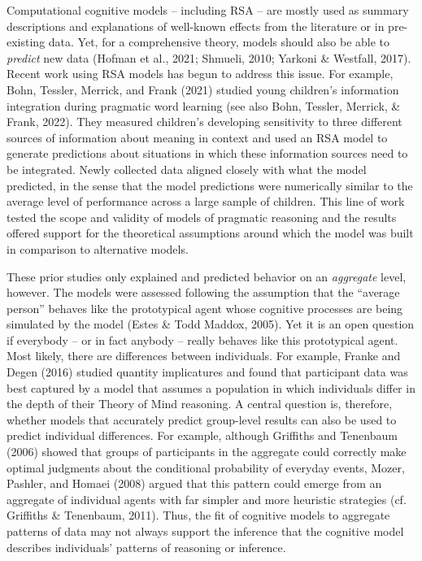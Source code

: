 \documentclass[
  man,floatsintext]{apa6}
\begin{document}
Computational cognitive models -- including RSA -- are mostly used as summary descriptions and explanations of well-known effects from the literature or in pre-existing data. Yet, for a comprehensive theory, models should also be able to \emph{predict} new data (Hofman et al., 2021; Shmueli, 2010; Yarkoni \& Westfall, 2017). Recent work using RSA models has begun to address this issue. For example, Bohn, Tessler, Merrick, and Frank (2021) studied young children's information integration during pragmatic word learning (see also Bohn, Tessler, Merrick, \& Frank, 2022). They measured children's developing sensitivity to three different sources of information about meaning in context and used an RSA model to generate predictions about situations in which these information sources need to be integrated. Newly collected data aligned closely with what the model predicted, in the sense that the model predictions were numerically similar to the average level of performance across a large sample of children. This line of work tested the scope and validity of models of pragmatic reasoning and the results offered support for the theoretical assumptions around which the model was built in comparison to alternative models.

These prior studies only explained and predicted behavior on an \emph{aggregate} level, however. The models were assessed following the assumption that the ``average person'' behaves like the prototypical agent whose cognitive processes are being simulated by the model (Estes \& Todd Maddox, 2005). Yet it is an open question if everybody -- or in fact anybody -- really behaves like this prototypical agent. Most likely, there are differences between individuals. For example, Franke and Degen (2016) studied quantity implicatures and found that participant data was best captured by a model that assumes a population in which individuals differ in the depth of their Theory of Mind reasoning. A central question is, therefore, whether models that accurately predict group-level results can also be used to predict individual differences. For example, although Griffiths and Tenenbaum (2006) showed that groups of participants in the aggregate could correctly make optimal judgments about the conditional probability of everyday events, Mozer, Pashler, and Homaei (2008) argued that this pattern could emerge from an aggregate of individual agents with far simpler and more heuristic strategies (cf. Griffiths \& Tenenbaum, 2011). Thus, the fit of cognitive models to aggregate patterns of data may not always support the inference that the cognitive model describes individuals' patterns of reasoning or inference.
\end{document}
